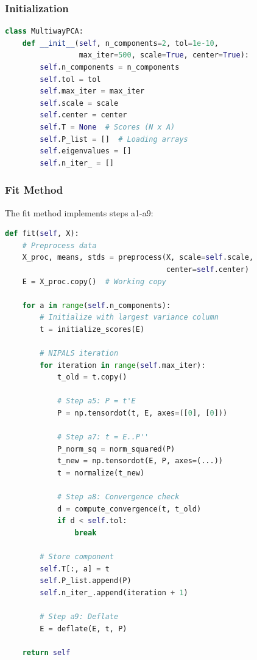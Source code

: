 \documentclass[12pt,a4paper]{article}
\begin{document}
\subsubsection{Initialization}
\begin{lstlisting}[language=Python]
class MultiwayPCA:
    def __init__(self, n_components=2, tol=1e-10,
                 max_iter=500, scale=True, center=True):
        self.n_components = n_components
        self.tol = tol
        self.max_iter = max_iter
        self.scale = scale
        self.center = center
        self.T = None  # Scores (N x A)
        self.P_list = []  # Loading arrays
        self.eigenvalues = []
        self.n_iter_ = []
\end{lstlisting}

\subsubsection{Fit Method}

The fit method implements steps a1-a9:

\begin{lstlisting}[language=Python, breaklines=true, basicstyle=\ttfamily\tiny]
def fit(self, X):
    # Preprocess data
    X_proc, means, stds = preprocess(X, scale=self.scale,
                                     center=self.center)
    E = X_proc.copy()  # Working copy

    for a in range(self.n_components):
        # Initialize with largest variance column
        t = initialize_scores(E)

        # NIPALS iteration
        for iteration in range(self.max_iter):
            t_old = t.copy()

            # Step a5: P = t'E
            P = np.tensordot(t, E, axes=([0], [0]))

            # Step a7: t = E..P''
            P_norm_sq = norm_squared(P)
            t_new = np.tensordot(E, P, axes=(...))
            t = normalize(t_new)

            # Step a8: Convergence check
            d = compute_convergence(t, t_old)
            if d < self.tol:
                break

        # Store component
        self.T[:, a] = t
        self.P_list.append(P)
        self.n_iter_.append(iteration + 1)

        # Step a9: Deflate
        E = deflate(E, t, P)

    return self
\end{lstlisting}
\end{document}
